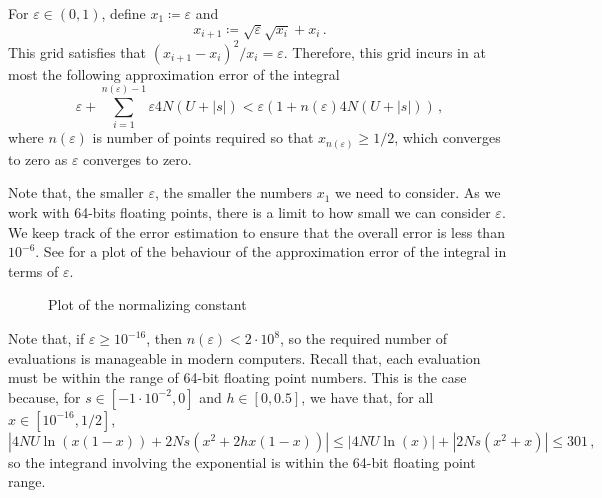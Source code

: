 \documentclass[a4paper,11pt]{article}
\newcommand{\1}{\mathds{1}}
\newcommand{\eps}{\varepsilon}
\newcommand{\defas}{\coloneqq}
\theoremstyle{plain} %
\theoremstyle{definition} %
\theoremstyle{remark} %
\begin{document}
For $\eps \in (0, 1)$, define $x_1 \defas \eps$ and 
\[
	x_{i + 1} \defas \sqrt{\eps} \sqrt{x_i} + x_i \,.
\]
This grid satisfies that $(x_{i + 1} - x_i)^2 / x_i = \eps$. 
Therefore, this grid incurs in at most the following approximation error of the integral
\[
	\eps 
		+ \sum_{i = 1}^{n(\eps)-1} \eps 4N (U + |s|) 
	< \eps \left(1 + n(\eps) 4 N (U + |s|) \right) \,,
\]
where $n(\eps)$ is number of points required so that $x_{n(\eps)} \ge 1/2$, which converges to zero as $\eps$ converges to zero. 

Note that, the smaller $\eps$, the smaller the numbers $x_1$ we need to consider.
As we work with 64-bits floating points, there is a limit to how small we can consider $\eps$.
We keep track of the error estimation to ensure that the overall error is less than $10^{-6}$.
See  for a plot of the behaviour of the approximation error of the integral in terms of $\eps$.

\begin{figure}[h]
	\centering
	\pgfplotsset{width=7cm}
	\caption{Plot of the normalizing constant}
	\label{Figure: Integration approximation error fast}
\end{figure}

Note that, if $\eps \ge 10^{-16}$, then $n(\eps) < 2 \cdot 10^8$, so the required number of evaluations is manageable in modern computers.
Recall that, each evaluation must be within the range of 64-bit floating point numbers.
This is the case because, for $s \in [-1 \cdot 10^{-2}, 0]$ and $h \in [0, 0.5]$, we have that, for all $x \in [10^{-16}, 1/2]$,
\[
	|4 N U \ln(x (1-x)) + 2 N s ( x^2 + 2h x(1-x))| \le |4 N U \ln(x)| + |2 N s ( x^2 + x )| \le 301 \,,
\]
so the integrand involving the exponential is within the 64-bit floating point range. 
\end{document}
